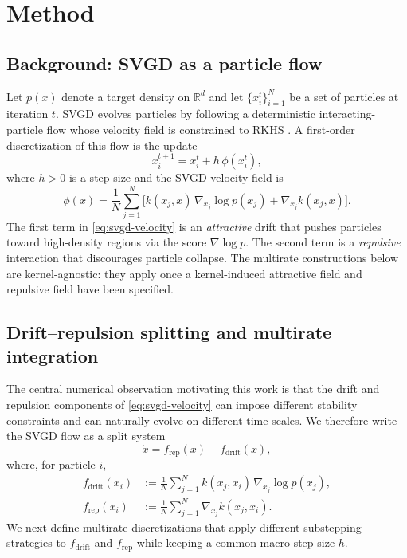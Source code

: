 \section{Method}
\label{sec:method}

\subsection{Background: SVGD as a particle flow}

Let $p(x)$ denote a target density on $\mathbb{R}^d$ and let
$\{x_i^t\}_{i=1}^N$ be a set of particles at iteration $t$.  SVGD evolves particles by following a deterministic
interacting-particle flow whose velocity field is constrained to RKHS \cite{liu2016svgd}. A first-order discretization of
this flow is the update
\begin{equation}
  x_i^{t+1} = x_i^t + h\,\phi(x_i^t),
  \label{eq:svgd-update}
\end{equation}
where $h>0$ is a step size and the SVGD velocity field is
\begin{equation}
  \phi(x) = \frac{1}{N}\sum_{j=1}^N
  \Big[ k(x_j, x)\,\nabla_{x_j}\log p(x_j) + \nabla_{x_j} k(x_j, x) \Big].
  \label{eq:svgd-velocity}
\end{equation}
The first term in \cref{eq:svgd-velocity} is an \emph{attractive} drift that
pushes particles toward high-density regions via the score $\nabla \log p$. The second term is a \emph{repulsive} interaction that discourages particle collapse.
The multirate constructions below are kernel-agnostic: they apply once a
kernel-induced attractive field and repulsive field have been specified.

\subsection{Drift--repulsion splitting and multirate integration}

The central numerical observation motivating this work is that the drift and
repulsion components of \cref{eq:svgd-velocity} can impose different stability
constraints and can naturally evolve on different time scales. We therefore
write the SVGD flow as a split system
\begin{equation}
  \dot{x} = f_{\text{rep}}(x) + f_{\text{drift}}(x),
  \label{eq:svgd-splitting}
\end{equation}
where, for particle $i$,
\begin{align}
  f_{\text{drift}}(x_i)
  &:= \frac{1}{N}\sum_{j=1}^N k(x_j, x_i)\,\nabla_{x_j}\log p(x_j),
  \label{eq:svgd-drift-term}\\
  f_{\text{rep}}(x_i)
  &:= \frac{1}{N}\sum_{j=1}^N \nabla_{x_j} k(x_j, x_i).
  \label{eq:svgd-rep-term}
\end{align}
We next define multirate discretizations that apply different substepping
strategies to $f_{\text{drift}}$ and $f_{\text{rep}}$ while keeping a common
macro-step size $h$.

